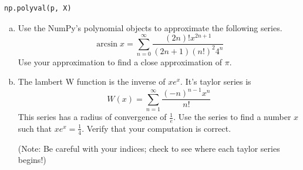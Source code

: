 \begin{lstlisting}
np.polyval(p, X)
\end{lstlisting}

\begin{problem}
\begin{enumerate}[a)]
\item Use the NumPy's polynomial objects to approximate the following series.
\[
\arcsin x = \sum_{n=0}^{\infty} \frac{\left(2 n\right) ! x^{2 n + 1}}{\left(2 n + 1\right)\left(n!\right)^2 4^n}
\]
Use your approximation to find a close approximation of $\pi$.

\item The lambert W function is the inverse of $x e^x$.
It's taylor series is
\[
W(x) = \sum_{n=1}^{\infty} \frac{\left(-n\right)^{n-1} x^n}{n!}
\]
This series has a radius of convergence of $\frac{1}{e}$.
Use the series to find a number $x$ such that $x e^x = \frac{1}{4}$.
Verify that your computation is correct.

(Note: Be careful with your indices; check to see where each taylor series begins!)
\end{enumerate}
\end{problem}

